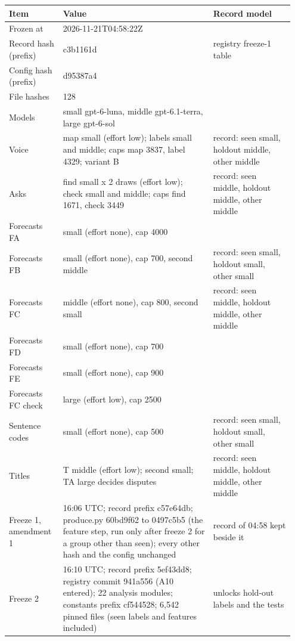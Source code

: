 {\scriptsize\setlength{\tabcolsep}{2pt}
\begin{tabular}{@{}p{0.18\linewidth}p{0.5\linewidth}p{0.27\linewidth}@{}}
\toprule
Item & Value & Record model \\
\midrule
Frozen at & 2026-11-21T04:58:22Z &  \\
Record hash (prefix) & c3b1161d & registry freeze-1 table \\
Config hash (prefix) & d95387a4 &  \\
File hashes & 128 &  \\
Models & small gpt-6-luna, middle gpt-6.1-terra, large gpt-6-sol &  \\
\midrule
Voice & map small (effort low); labels small and middle; caps map 3837, label 4329; variant B & record: seen small, holdout middle, other middle \\
Asks & find small x 2 draws (effort low); check small and middle; caps find 1671, check 3449 & record: seen middle, holdout middle, other middle \\
Forecasts FA & small (effort none), cap 4000 &  \\
Forecasts FB & small (effort none), cap 700, second middle & record: seen small, holdout small, other small \\
Forecasts FC & middle (effort none), cap 800, second small & record: seen middle, holdout middle, other middle \\
Forecasts FD & small (effort none), cap 700 &  \\
Forecasts FE & small (effort none), cap 900 &  \\
Forecasts FC check & large (effort low), cap 2500 &  \\
Sentence codes & small (effort none), cap 500 & record: seen small, holdout small, other small \\
Titles & T middle (effort low); second small; TA large decides disputes & record: seen middle, holdout middle, other middle \\
\midrule
Freeze 1, amendment 1 & 16:06 UTC; record prefix c57e64db; produce.py 60bd9f62 to 0497c5b5 (the feature step, run only after freeze 2 for a group other than seen); every other hash and the config unchanged & record of 04:58 kept beside it \\
Freeze 2 & 16:10 UTC; record prefix 5ef43dd8; registry commit 941a556 (A10 entered); 22 analysis modules; constants prefix cf544528; 6{,}542 pinned files (seen labels and features included) & unlocks hold-out labels and the tests \\
\bottomrule
\end{tabular}}
